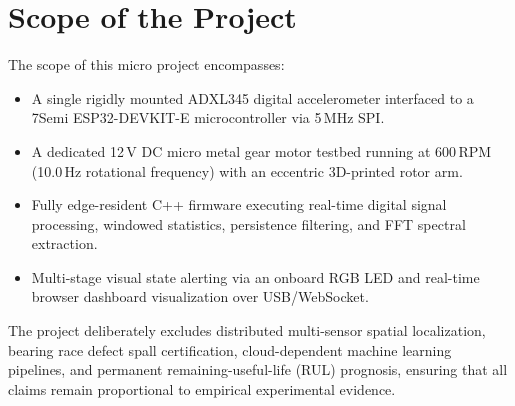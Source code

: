 \section{Scope of the Project}
\hspace{2em}The scope of this micro project encompasses:
\begin{itemize}
    \item A single rigidly mounted ADXL345 digital accelerometer interfaced to a 7Semi ESP32-DEVKIT-E microcontroller via 5\,MHz SPI.
    \item A dedicated 12\,V DC micro metal gear motor testbed running at 600\,RPM (10.0\,Hz rotational frequency) with an eccentric 3D-printed rotor arm.
    \item Fully edge-resident C++ firmware executing real-time digital signal processing, windowed statistics, persistence filtering, and FFT spectral extraction.
    \item Multi-stage visual state alerting via an onboard RGB LED and real-time browser dashboard visualization over USB/WebSocket.
\end{itemize}
\hspace{2em}The project deliberately excludes distributed multi-sensor spatial localization, bearing race defect spall certification, cloud-dependent machine learning pipelines, and permanent remaining-useful-life (RUL) prognosis, ensuring that all claims remain proportional to empirical experimental evidence.

